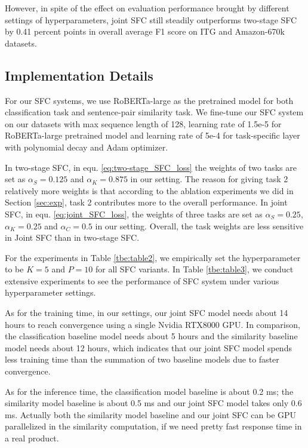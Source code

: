 However,  in  spite of the effect on evaluation performance brought by different
settings  of hyperparameters, joint SFC still steadily outperforms two-stage SFC
by  0.41  percent  points  in  overall  average  F1 score on ITG and Amazon-670k
datasets.

\subsection{Implementation Details}
For  our  SFC  systems,  we  use RoBERTa-large as the pretrained model for both
classification  task  and  sentence-pair similarity task. We fine-tune
our  SFC  system  on  our datasets with max sequence length of 128,
learning  rate  of 1.5e-5 for RoBERTa-large pretrained model and learning rate
of  5e-4  for  task-specific  layer  with polynomial decay and Adam optimizer.

In two-stage SFC, in equ. \ref{eq:two-stage_SFC_loss} the weights of two tasks
are  set  as  $\alpha_S=0.125$ and $\alpha_K=0.875$ in our setting. The reason
for  giving  task  2 relatively more weights is that according to the ablation
experiments  we  did  in Section \ref{sec:exp}, task 2 contributes more to the
overall  performance.  In  joint  SFC,  in  equ.  \ref{eq:joint_SFC_loss}, the
weights  of  three  tasks  are  set  as  $\alpha_S=0.25$,  $\alpha_K=0.25$ and
$\alpha_C=0.5$  in  our setting. Overall, the task weights are less sensitive
in Joint SFC than in two-stage SFC.

For  the  experiments  in  Table  \ref{tbe:table2},  we  empirically  set  the
hyperparameter  to  be  $K=5$  and  $P=10$  for  all  SFC  variants.  In Table
\ref{tbe:table3},  we  conduct extensive experiments to see the performance of
SFC system under various hyperparameter settings.

As for the training time, in our settings, our joint SFC model needs about 14
hours to reach convergence using a single Nvidia RTX8000 GPU. In comparison, the classification baseline model needs about 5 hours and the similarity baseline model
needs about 12 hours, which indicates that our joint SFC model spends less training
time than the summation of two baseline models due to faster convergence. 

As for the inference time, the classification model baseline is about 0.2 ms;
the similarity model baseline is about 0.5 ms and our joint SFC model takes only 0.6 ms.
Actually both the similarity model baseline and our joint SFC can be GPU
parallelized in the similarity computation, if we need pretty fast response time
in a real product.

